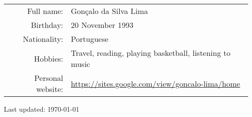 \documentclass[a4paper,11pt]{article} %
\begin{document}
\begin{tabular}{rp{13	cm}}
	Full name: & Gonçalo da Silva Lima \\
	Birthday: & 20 November 1993 \\
	Nationality: & Portuguese	\\
	Hobbies: & Travel, reading, playing basketball, listening to music \\
	Personal website: & \href{https://sites.google.com/view/goncalo-lima/home}{https://sites.google.com/view/goncalo-lima/home} \\
\end{tabular}

\vspace{2cm}
\begin{flushright}
	Last updated: \today \\
\end{flushright}
\end{document}
